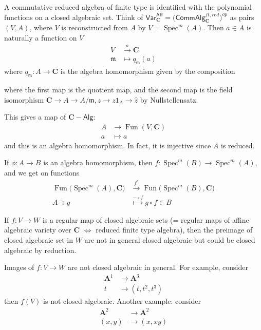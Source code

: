 \documentclass[
11pt, %
letterpaper， %
oneside, %
headinclude,footinclude, %
BCOR5mm, %
]{scrartcl}
\newcommand{\C}{{\mathbf{C}}}
\newcommand{\A}{{\mathbf{A}}}
\newcommand{\m}{{\mathfrak{m}}}
\newcommand{\var}{\mathsf{Var}}
\newcommand{\aff}{\mathsf{Aff}}
\newcommand{\alg}{\mathsf{Alg}}
\newcommand{\calg}{\mathsf{CommAlg}}
\newcommand{\fun}{\operatorname{Fun}}
\newcommand{\spec}{\operatorname{Spec}}
\begin{document}
A commutative reduced algebra of finite type is identified with the polynomial functions on a closed  algebraic set. Think of  $	\var^{\aff}_{\C}=\Big(\calg_{\C}^{ft,red} \Big)^{op}$ as pairs $(V,A)$, where $V$ is reconstructed from $A$ by $V=\spec^m(A)$. Then $a\in A$ is naturally a function on $V$
\begin{align*}
V &\stackrel{a}{\longrightarrow}  \C\\
\m & \mapsto q_{\m}(a)
\end{align*}
where $q_{\m}:A\to \C$ is the algebra homomorphism given by the composition 
\begin{center}
\end{center}
where the first map is the quotient map, and the second map is the field isomorphism $\C \to A\to A/{\m}, z\to z 1_A\to \hat{z}$ by Nullstellensatz.

\begin{rem}
	This gives a map of $\C-\alg$:
	\begin{align*}
	A&\longrightarrow \fun(V,\C)\\
	a &\mapsto a
	\end{align*}
	and this is an algebra homomorphism. In fact, it is injective since $A$ is reduced.
\end{rem}

\begin{rem}
	 If $\phi:A\to B$ is an algebra homomorphism, then  $f:\spec^m(B)\to \spec^m (A)$, and we get on functions
\begin{align*}
\fun \big(\spec^m(A), \C \big)  &\stackrel{f^*}{\longrightarrow} 	\fun \big(\spec^m(B), \C \big)\\
A\ni g&\stackrel{-\circ f}{\mapsto} g\circ f \in B
\end{align*}
\end{rem}
\begin{ex}
	If $f:V\to W$ is a regular map of closed algebraic sets (= regular maps of affine algebraic variety over $\C$ $\Leftrightarrow$ reduced finite type algebra), then the preimage of closed algebraic set in $W$ are not in general closed algebraic but could be closed algebraic by reduction. 
\end{ex}
\begin{ex}
	Images of $f:V\to W$ are not closed algebraic in general. For example, consider 
	\begin{align*}
	\A^1 &\longrightarrow \A^3\\
	t&\to (t,t^2,t^3)
	\end{align*}
	then $f(V)$ is not closed algebraic. Another example: consider
		\begin{align*}
	\A^2 &\longrightarrow \A^2\\
	(x,y) &\to (x,xy)
	\end{align*}
\end{ex}
\end{document}
